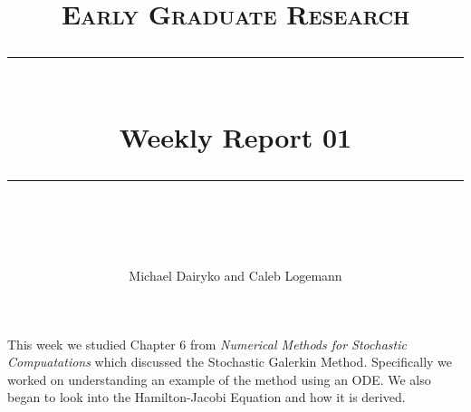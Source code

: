 \documentclass[paper=a4, fontsize=11pt]{scrartcl} %
\theoremstyle{plain}
\theoremstyle{remark}
\begin{document}
 
\newcommand{\horrule}[1]{\rule{\linewidth}{#1}} %

\title{	
\normalfont \normalsize 
\textsc{Early Graduate Research} \\ [25pt] %
\horrule{0.5pt} \\[0.4cm] %
\huge Weekly Report 01  \\ %
\horrule{2pt} \\[0.5cm] %
}

\author{Michael Dairyko and Caleb Logemann } %
\date{}

 

\maketitle



This week we studied Chapter 6 from {\em Numerical Methods for Stochastic Compuatations} which discussed the Stochastic Galerkin Method. Specifically we worked on understanding an example of the method using an ODE. We also began to look into the Hamilton-Jacobi Equation and how it is derived.
\end{document}
